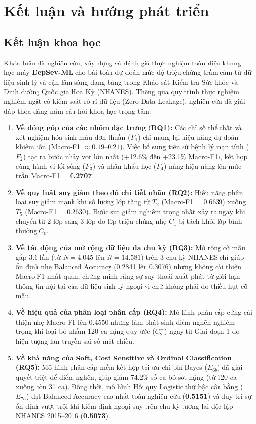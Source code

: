 \chapter{Kết luận và hướng phát triển}
\label{ch:ket-luan}

\section{Kết luận khoa học}
\label{sec:ket-luan-khoa-hoc}

Khóa luận đã nghiên cứu, xây dựng và đánh giá thực nghiệm toàn diện khung học máy \textbf{DepSev-ML} cho bài toán dự đoán mức độ triệu chứng trầm cảm từ dữ liệu sinh lý và cận lâm sàng dạng bảng trong Khảo sát Kiểm tra Sức khỏe và Dinh dưỡng Quốc gia Hoa Kỳ (NHANES). Thông qua quy trình thực nghiệm nghiêm ngặt có kiểm soát rò rỉ dữ liệu (Zero Data Leakage), nghiên cứu đã giải đáp thỏa đáng năm câu hỏi khoa học trọng tâm:

\begin{enumerate}
    \item \textbf{Về đóng góp của các nhóm đặc trưng (RQ1):} Các chỉ số thể chất và xét nghiệm hóa sinh máu đơn thuần ($F_1$) chỉ mang lại hiệu năng dự đoán khiêm tốn (Macro-F1 $\approx 0.19$--$0.21$). Việc bổ sung tiền sử bệnh lý mạn tính ($F_2$) tạo ra bước nhảy vọt lớn nhất (+12.6\% đến +23.1\% Macro-F1), kết hợp cùng hành vi lối sống ($F_3$) và nhân khẩu học ($F_4$) nâng hiệu năng lên mức trần Macro-F1 = \textbf{0.2707}.
    \item \textbf{Về quy luật suy giảm theo độ chi tiết nhãn (RQ2):} Hiệu năng phân loại suy giảm mạnh khi số lượng lớp tăng từ $T_2$ (Macro-F1 = 0.6639) xuống $T_5$ (Macro-F1 = 0.2630). Bước sụt giảm nghiêm trọng nhất xảy ra ngay khi chuyển từ 2 lớp sang 3 lớp do lớp triệu chứng nhẹ $C_1$ bị tách khỏi lớp bình thường $C_0$.
    \item \textbf{Về tác động của mở rộng dữ liệu đa chu kỳ (RQ3):} Mở rộng cỡ mẫu gấp 3.6 lần (từ $N = 4.045$ lên $N = 14.581$) trên 3 chu kỳ NHANES chỉ giúp ổn định nhẹ Balanced Accuracy (0.2841 lên 0.3076) nhưng không cải thiện Macro-F1 nhất quán, chứng minh rằng sự suy thoái xuất phát từ giới hạn thông tin nội tại của dữ liệu sinh lý ngoại vi chứ không phải do thiếu hụt cỡ mẫu.
    \item \textbf{Về hiệu quả của phân loại phân cấp (RQ4):} Mô hình phân cấp cứng cải thiện nhẹ Macro-F1 lên 0.4550 nhưng làm phát sinh điểm nghẽn nghiêm trọng khi loại bỏ nhầm 120 ca nặng quy ước ($C_2^+$) ngay từ Giai đoạn 1 do hiện tượng lan truyền sai số một chiều.
    \item \textbf{Về khả năng của Soft, Cost-Sensitive và Ordinal Classification (RQ5):} Mô hình phân cấp mềm kết hợp tối ưu chi phí Bayes ($E_{6b}$) đã giải quyết triệt để điểm nghẽn, giúp giảm 74.2\% số ca bỏ sót nặng (từ 120 ca xuống còn 31 ca). Đồng thời, mô hình Hồi quy Logistic thứ bậc cân bằng ($E_{7a}$) đạt Balanced Accuracy cao nhất toàn nghiên cứu (\textbf{0.5151}) và duy trì sự ổn định vượt trội khi kiểm định ngoại suy trên chu kỳ tương lai độc lập NHANES 2015--2016 (\textbf{0.5073}).
\end{enumerate}

